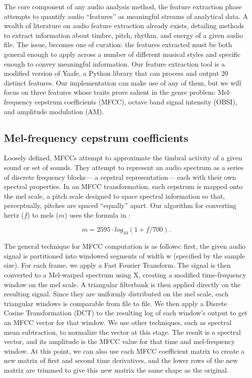 \documentclass[12pt,twocolumn,titlepage]{article}
\begin{document}
The core component of any audio analysis method, the feature extraction phase attempts to quantify audio ``features'' as meaningful streams of analytical data. A wealth of literature on audio feature extraction already exists, detailing methods to extract information about timbre, pitch, rhythm, and energy of a given audio file. The issue, becomes one of curation: the features extracted must be both general enough to apply across a number of different musical styles and specific enough to convey meaningful information. Our feature extraction tool is a modified version of Yaafe, a Python library that can process and output 20 distinct features. \cite{yaafe} Our implementation can make use of any of them, but we will focus on three features whose traits prove salient in the genre problem: Mel-frequency cepstrum coefficients (MFCC), octave band signal intensity (OBSI), and amplitude modulation (AM). 

\subsection{Mel-frequency cepstrum coefficients}

Loosely defined, MFCCs attempt to approximate the timbral activity of a given sound or set of sounds. They attempt to represent an audio spectrum as a series of discrete frequency blocks— a cepstral representation— each with their own spectral properties. In an MFCC transformation, each cepstrum is mapped onto the mel scale, a pitch scale designed to space spectral information so that, perceptually, pitches are spaced ``equally'' apart. Our algorithm for converting hertz ($f$) to mels ($m$) uses the formula in \cite{Speechcomm}: 

\begin{equation}\label{}
m = 2595 \cdot log_{10}(1 + f/700).
\end{equation}

The general technique for MFCC computation is as follows: first, the given audio signal is partitioned into windowed segments of width w (specified by the sample size). For each frame, we apply a Fast Fourier Transform. The signal is then converted to a Mel-warped spectrum using X, creating a modified time-frequency window on the mel scale. A triangular filterbank is then applied directly on the resulting signal. Since they are uniformly distributed on the mel scale, each triangular windows is comparable from file to file. \cite{Essid} We then apply a Disrete Cosine Transformation (DCT) to the resulting log of each window's output to get an MFCC vector for that window. We use other techniques, such as spectral mean subtraction, to normalize the vector at this stage. The result is a spectral vector, and its amplitude is the MFCC value for that time and mel-frequency window. At this point, we can also use each MFCC coefficient matrix to create a new matrix of first and second time derivatives, and the lower rows of the new matrix are trimmed to give this new matrix the same shape as the original. 
\end{document}
